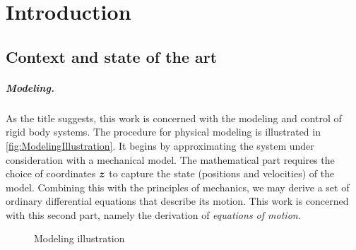 \chapter{Introduction}\label{sec:intro}

\section{Context and state of the art}

\paragraph{Modeling.}
As the title suggests, this work is concerned with the modeling and control of rigid body systems.
The procedure for physical modeling is illustrated in \autoref{fig:ModelingIllustration}.
It begins by approximating the system under consideration with a mechanical model.
The mathematical part requires the choice of coordinates $\boldsymbol{z}$ to capture the state (positions and velocities) of the model.
Combining this with the principles of mechanics, we may derive a set of ordinary differential equations that describe its motion.
This work is concerned with this second part, namely the derivation of \textit{equations of motion}.

\begin{figure}[ht]
 \centering
 \newcommand{\ModelingIllustrationOde}{$\dot{\sysState}=\tuple{f}(\sysState,\sysInput)$}
 
 \caption{Modeling illustration}
 \label{fig:ModelingIllustration}
\end{figure}

